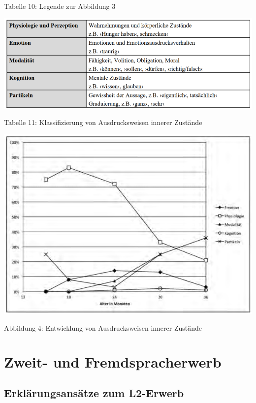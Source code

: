 \documentclass[
  letterpaper,
]{scrbook}
\begin{document}
Tabelle 10: Legende zur Abbildung 3

\includegraphics[width=1\textwidth,height=\textheight]{./pictures/kauschke_tab11.png}

Tabelle 11: Klassifizierung von Ausdrucksweisen innerer Zustände

\includegraphics[width=1\textwidth,height=\textheight]{./pictures/kauschke_abb4.png}

Abbildung 4: Entwicklung von Ausdrucksweisen innerer Zustände

\part{Zweit- und Fremdspracherwerb}

\hypertarget{sec-L2erwerb}{%
\chapter{Erklärungsansätze zum L2-Erwerb}\label{sec-L2erwerb}}
\end{document}
